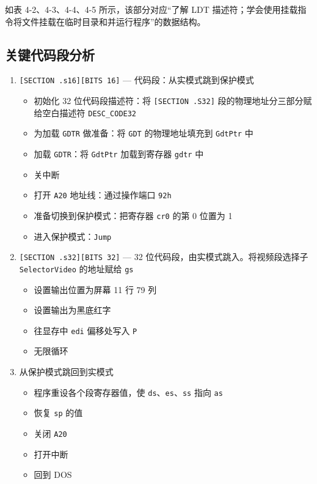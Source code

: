 如表 4-2、4-3、4-4、4-5 所示，该部分对应“了解 LDT 描述符；学会使用挂载指令将文件挂载在临时目录和并运行程序”的数据结构。

\subsection{关键代码段分析}
\begin{enumerate}
    \item \texttt{[SECTION .s16][BITS 16]} --- 代码段：从实模式跳到保护模式
    \begin{itemize}
        \item 初始化 32 位代码段描述符：将 \texttt{[SECTION .S32]} 段的物理地址分三部分赋给空白描述符 \texttt{DESC\_CODE32}
        \item 为加载 \texttt{GDTR} 做准备：将 \texttt{GDT} 的物理地址填充到 \texttt{GdtPtr} 中
        \item 加载 \texttt{GDTR}：将 \texttt{GdtPtr} 加载到寄存器 \texttt{gdtr} 中
        \item 关中断
        \item 打开 \texttt{A20} 地址线：通过操作端口 \texttt{92h}
        \item 准备切换到保护模式：把寄存器 \texttt{cr0} 的第 0 位置为 1
        \item 进入保护模式：\texttt{Jump}
    \end{itemize}
    
    \item \texttt{[SECTION .s32][BITS 32]} --- 32 位代码段，由实模式跳入。将视频段选择子 \texttt{SelectorVideo} 的地址赋给 \texttt{gs}
    \begin{itemize}
        \item 设置输出位置为屏幕 11 行 79 列
        \item 设置输出为黑底红字
        \item 往显存中 \texttt{edi} 偏移处写入 \texttt{P}
        \item 无限循环
    \end{itemize}
    
    \item 从保护模式跳回到实模式
    \begin{itemize}
        \item 程序重设各个段寄存器值，使 \texttt{ds}、\texttt{es}、\texttt{ss} 指向 \texttt{as}
        \item 恢复 \texttt{sp} 的值
        \item 关闭 \texttt{A20}
        \item 打开中断
        \item 回到 DOS
    \end{itemize}
    

\end{enumerate}
